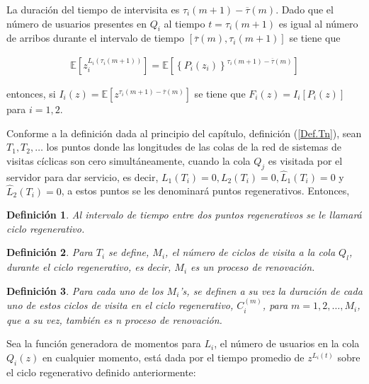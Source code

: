 \documentclass{article}
\newtheorem{Def}{Definición}
\newcommand{\esp}{\mathbb{E}}
\begin{document}
La duraci\'on del tiempo de intervisita es $\tau_{i}\left(m+1\right)-\overline{\tau}\left(m\right)$. Dado que el n\'umero de usuarios presentes en $Q_{i}$ al tiempo $t=\tau_{i}\left(m+1\right)$ es igual al n\'umero de arribos durante el intervalo de tiempo $\left[\overline{\tau}\left(m\right),\tau_{i}\left(m+1\right)\right]$ se tiene que


\begin{eqnarray*}
\esp\left[z_{i}^{L_{i}\left(\tau_{i}\left(m+1\right)\right)}\right]=\esp\left[\left\{P_{i}\left(z_{i}\right)\right\}^{\tau_{i}\left(m+1\right)-\overline{\tau}\left(m\right)}\right]
\end{eqnarray*}

entonces, si $I_{i}\left(z\right)=\esp\left[z^{\tau_{i}\left(m+1\right)-\overline{\tau}\left(m\right)}\right]$
se tiene que $F_{i}\left(z\right)=I_{i}\left[P_{i}\left(z\right)\right]$
para $i=1,2$.

Conforme a la definici\'on dada al principio del cap\'itulo, definici\'on (\ref{Def.Tn}), sean $T_{1},T_{2},\ldots$ los puntos donde las longitudes de las colas de la red de sistemas de visitas c\'iclicas son cero simult\'aneamente, cuando la cola $Q_{j}$ es visitada por el servidor para dar servicio, es decir, $L_{1}\left(T_{i}\right)=0,L_{2}\left(T_{i}\right)=0,\hat{L}_{1}\left(T_{i}\right)=0$ y $\hat{L}_{2}\left(T_{i}\right)=0$, a estos puntos se les denominar\'a puntos regenerativos. Entonces, 

\begin{Def}
Al intervalo de tiempo entre dos puntos regenerativos se le llamar\'a ciclo regenerativo.
\end{Def}

\begin{Def}
Para $T_{i}$ se define, $M_{i}$, el n\'umero de ciclos de visita a la cola $Q_{l}$, durante el ciclo regenerativo, es decir, $M_{i}$ es un proceso de renovaci\'on.
\end{Def}

\begin{Def}
Para cada uno de los $M_{i}$'s, se definen a su vez la duraci\'on de cada uno de estos ciclos de visita en el ciclo regenerativo, $C_{i}^{(m)}$, para $m=1,2,\ldots,M_{i}$, que a su vez, tambi\'en es n proceso de renovaci\'on.
\end{Def}


Sea la funci\'on generadora de momentos para $L_{i}$, el n\'umero de usuarios en la cola $Q_{i}\left(z\right)$ en cualquier momento, est\'a dada por el tiempo promedio de $z^{L_{i}\left(t\right)}$ sobre el ciclo regenerativo definido anteriormente:
\end{document}
